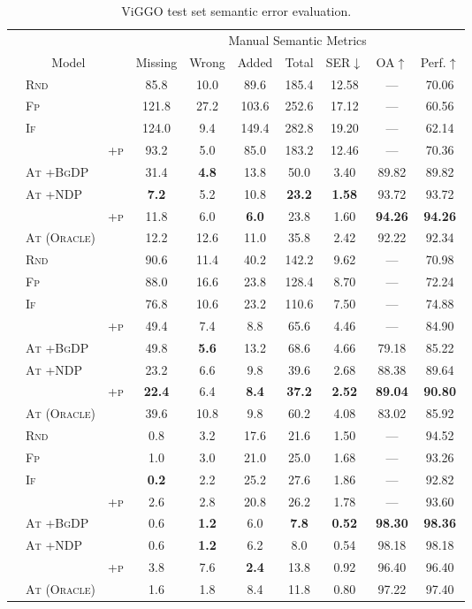 \begin{table*}[t!]
\centering

\begin{tabular}{lll c c c c  c c c}
\toprule
 & & &  \multicolumn{7}{c}{Manual Semantic Metrics} \\
 \cmidrule(lr){4-10} 
 \multicolumn{3}{c}{Model} &  Missing &  Wrong & Added & Total & SER$\downarrow$ & OA$\uparrow$ & Perf.$\uparrow$\\
 \midrule
 \parbox[t]{2mm}{}
 &\textsc{Rnd} & &85.8&10.0&89.6&185.4&12.58&---&70.06 \\
 &\textsc{Fp} & &121.8&27.2&103.6&252.6&17.12&---&60.56 \\
 &\textsc{If} & &124.0&9.4&149.4&282.8&19.20&---&62.14 \\
 &  & \textsc{+p}&93.2&5.0&85.0&183.2&12.46&---&70.36 \\
 &\textsc{At +BgDP} & &31.4&\textbf{  4.8}&13.8&50.0&3.40&89.82&89.82 \\
 &\textsc{At +NDP} & &\textbf{  7.2}&5.2&10.8&\textbf{ 23.2}&\textbf{ 1.58}&93.72&93.72 \\
 &  & \textsc{+p}&11.8&6.0&\textbf{  6.0}&23.8&1.60&\textbf{94.26}&\textbf{94.26} \\
 &\textsc{At (Oracle)} & &12.2&12.6&11.0&35.8&2.42&92.22&92.34 \\
 \midrule
 \parbox[t]{2mm}{}
 &\textsc{Rnd} & &90.6&11.4&40.2&142.2&9.62&---&70.98 \\
 &\textsc{Fp} & &88.0&16.6&23.8&128.4&8.70&---&72.24 \\
 &\textsc{If} & &76.8&10.6&23.2&110.6&7.50&---&74.88 \\
 &  & \textsc{+p}&49.4&7.4&8.8&65.6&4.46&---&84.90 \\
 &\textsc{At +BgDP} & &49.8&\textbf{  5.6}&13.2&68.6&4.66&79.18&85.22 \\
 &\textsc{At +NDP} & &23.2&6.6&9.8&39.6&2.68&88.38&89.64 \\
 &  & \textsc{+p}&\textbf{ 22.4}&6.4&\textbf{  8.4}&\textbf{ 37.2}&\textbf{ 2.52}&\textbf{89.04}&\textbf{90.80} \\
 &\textsc{At (Oracle)} & &39.6&10.8&9.8&60.2&4.08&83.02&85.92 \\
 \midrule
 \parbox[t]{2mm}{}
 &\textsc{Rnd} & &0.8&3.2&17.6&21.6&1.50&---&94.52 \\
 &\textsc{Fp} & &1.0&3.0&21.0&25.0&1.68&---&93.26 \\
 &\textsc{If} & &\textbf{  0.2}&2.2&25.2&27.6&1.86&---&92.82 \\
 &  & \textsc{+p}&2.6&2.8&20.8&26.2&1.78&---&93.60 \\
 &\textsc{At +BgDP} & &0.6&\textbf{  1.2}&6.0&\textbf{  7.8}&\textbf{ 0.52}&\textbf{98.30}&\textbf{98.36} \\
 &\textsc{At +NDP} & &0.6&\textbf{  1.2}&6.2&8.0&0.54&98.18&98.18 \\
 &  & \textsc{+p}&3.8&7.6&\textbf{  2.4}&13.8&0.92&96.40&96.40 \\
 &\textsc{At (Oracle)} & &1.6&1.8&8.4&11.8&0.80&97.22&97.40 \\
 \midrule
 \end{tabular}

\caption{ViGGO test set semantic error evaluation.}
\label{app:viggo.sem}
\end{table*}
